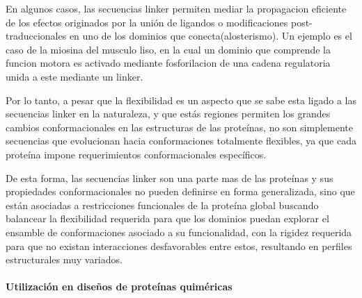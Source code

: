En algunos casos, las secuencias linker permiten mediar la propagacion eficiente de los efectos originados por la unión de ligandos o modificaciones post-traduccionales en uno de los dominios que conecta(alosterismo).
Un ejemplo es el caso de la miosina del musculo liso, en la cual un dominio que comprende la funcion motora es activado mediante fosforilacion  de una cadena regulatoria unida a este mediante un linker\cite{ikebe1998hinge}.






Por lo tanto, a pesar que la flexibilidad es un aspecto que se sabe esta ligado a las secuencias linker en la naturaleza\cite{wriggers2005control}, 
y que estás regiones permiten los grandes cambios conformacionales en las estructuras de las proteínas, 
no son simplemente secuencias que evolucionan hacia conformaciones totalmente flexibles, ya que cada proteína impone requerimientos conformacionales específicos. 

De esta forma, las secuencias linker son una parte mas de las proteínas y sus propiedades conformacionales no pueden definirse en forma generalizada, sino que están 
asociadas a restricciones funcionales de la proteína global buscando balancear la flexibilidad requerida 
para que los dominios puedan explorar el ensamble de conformaciones asociado a su funcionalidad, con la rigidez requerida para que no existan interacciones desfavorables entre estos, 
resultando en perfiles estructurales muy variados.




\paragraph{Utilización en diseños de proteínas quiméricas} \hspace{0pt} \\

